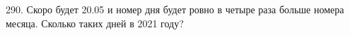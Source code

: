 290. Скоро будет 20.05 и номер дня будет ровно в четыре раза больше номера месяца. Сколько таких дней в 2021 году?\\
